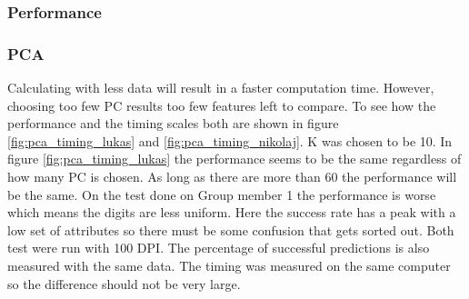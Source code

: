\subsubsection{Performance}

\begin{figure}[H]
\centering
{}
\end{figure}

\begin{figure}[H]
\centering
{}
\end{figure}




\subsubsection{PCA}

Calculating with less data will result in a faster computation time.
However, choosing too few PC results too few features left to compare.
To see how the performance and the timing scales both are shown in figure \ref{fig:pca_timing_lukas} and \ref{fig:pca_timing_nikolaj}. K was chosen to be 10.
In figure \ref{fig:pca_timing_lukas} the performance seems to be the same regardless of how many PC is chosen. As long as there are more than 60 the performance will be the same.
On the test done on Group member 1 the performance is worse which means the digits are less uniform. 
Here the success rate has a peak with a low set of attributes so there must be some confusion that gets sorted out. 
Both test were run with 100 DPI. The percentage of successful predictions is also measured with the same data.
The timing was measured on the same computer so the difference should not be very large. 

